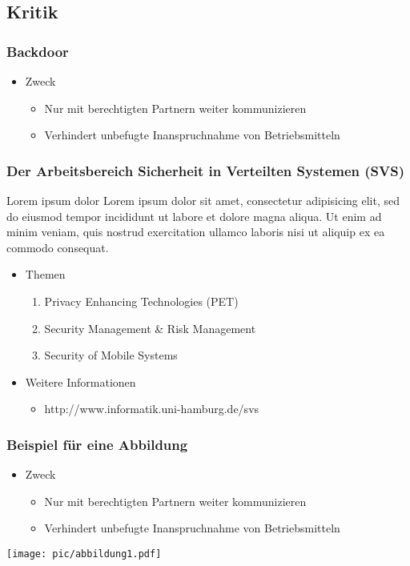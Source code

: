 \documentclass[t, xcolor=dvipsnames]{beamer}
\begin{document}
\subsection{Kritik}\begin{frame}
	\frametitle{Backdoor}
	\begin{itemize}
		\item Zweck
			\begin{itemize}
				\item Nur mit \alert{berechtigten Partnern} weiter kommunizieren
				\item Verhindert unbefugte Inanspruchnahme von Betriebsmitteln
			\end{itemize}
	\end{itemize}
	\vspace{\fill}
\end{frame}


\begin{frame}
	\frametitle{Der Arbeitsbereich Sicherheit in Verteilten Systemen (SVS)}
	\begin{block}{Lorem ipsum dolor}
		Lorem ipsum dolor sit amet, consectetur adipisicing elit, sed do eiusmod tempor incididunt ut labore et dolore magna aliqua. Ut enim ad minim veniam, quis nostrud exercitation ullamco laboris nisi ut aliquip ex ea commodo consequat. 
	\end{block}
	\begin{itemize}
		\item Themen
			\begin{enumerate}
				\item Privacy Enhancing Technologies (PET)
				\item Security Management \& Risk Management
				\item Security of Mobile Systems
			\end{enumerate}
		\item Weitere Informationen
			\begin{itemize}
				\item http://www.informatik.uni-hamburg.de/svs
			\end{itemize}
	\end{itemize}
\end{frame}


\begin{frame}
	\frametitle{Beispiel für eine Abbildung}
	\begin{itemize}
		\item Zweck
			\begin{itemize}
				\item Nur mit \alert{berechtigten Partnern} weiter kommunizieren
				\item Verhindert unbefugte Inanspruchnahme von Betriebsmitteln
			\end{itemize}
	\end{itemize}
	\vspace{\fill}
	\pause %
	\begin{center}
		\texttt{[image: pic/abbildung1.pdf]}
	\end{center}
\end{frame}
\end{document}
